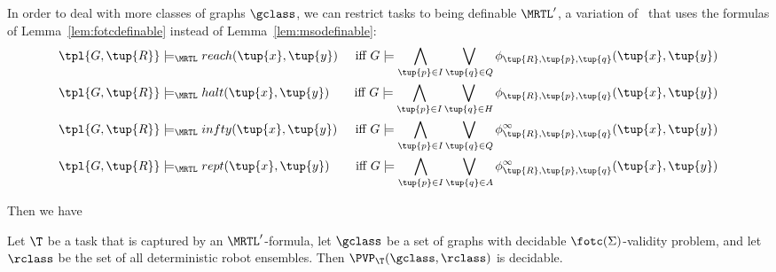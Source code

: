 
In order to deal with more classes of graphs $\gclass$, we can restrict tasks to
being definable $\MRTL'$, a variation of \MRTL\ that uses the formulas of
Lemma~\ref{lem:fotcdefinable} instead of Lemma~\ref{lem:msodefinable}:
\begin{align*}
\tpl{G,\tup{R}} &\models_\MRTL reach(\tup{x},\tup{y}) & \textrm{ iff } G \models
\bigwedge_{\tup{p} \in I} \bigvee_{\tup{q} \in Q}
\phi_{\tup{R},\tup{p},\tup{q}}(\tup{x},\tup{y})\\
%
\tpl{G,\tup{R}} &\models_\MRTL halt(\tup{x},\tup{y}) & \textrm{ iff } G \models
\bigwedge_{\tup{p} \in I} \bigvee_{\tup{q} \in H}
\phi_{\tup{R},\tup{p},\tup{q}}(\tup{x},\tup{y})\\
%
\tpl{G,\tup{R}} &\models_\MRTL infty(\tup{x},\tup{y}) & \textrm{ iff } G \models
\bigwedge_{\tup{p} \in I} \bigvee_{\tup{q} \in Q}
\phi^\infty_{\tup{R},\tup{p},\tup{q}}(\tup{x},\tup{y})\\
%
\tpl{G,\tup{R}}& \models_\MRTL rept(\tup{x},\tup{y}) & \textrm{ iff } G \models
\bigwedge_{\tup{p} \in I} \bigvee_{\tup{q} \in A}
\phi^\infty_{\tup{R},\tup{p},\tup{q}}(\tup{x},\tup{y})\\
\end{align*}

Then we have
\begin{theorem}
Let $\T$ be a task that is captured by an $\MRTL'$-formula, let $\gclass$ be a
set of graphs with decidable $\fotc(\Sigma)$-validity problem, and
let $\rclass$ be the set of all deterministic robot ensembles. Then
$\PVP_\T(\gclass,\rclass)$ is decidable.
\end{theorem}

